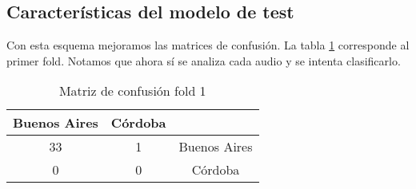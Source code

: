 \subsection{Características del modelo de test}

Con esta esquema mejoramos las matrices de confusión. La tabla \ref{mat_conf_f1} corresponde al primer fold. Notamos que ahora sí se analiza cada audio y se intenta clasificarlo. 

\begin{table}[H]
	\centering
	\begin{tabular}{|c|c|c|}
		\hline
		Buenos Aires & Córdoba & \\ \hline
		33 & 1 & Buenos Aires\\ \hline
		0 & 0 & Córdoba\\ \hline
	\end{tabular}
	\caption{Matriz de confusión fold 1}
	\label{mat_conf_f1}
\end{table}

